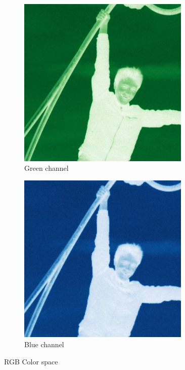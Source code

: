\begin{figure}[H]
\begin{subfigure}[b]{0.3\textwidth}
        \includegraphics[width=0.9\textwidth]{src/assets/tests/green.png}
        \caption{Green channel}
        \label{fig:tests-green}
    \end{subfigure}
    \begin{subfigure}[b]{0.3\textwidth}
        \centering
        \includegraphics[width=0.9\textwidth]{src/assets/tests/blue.png}
        \caption{Blue channel}
        \label{fig:tests-blue}
    \end{subfigure}
    \caption{RGB Color space}
    \label{fig:tests-rgb}
\end{figure}

